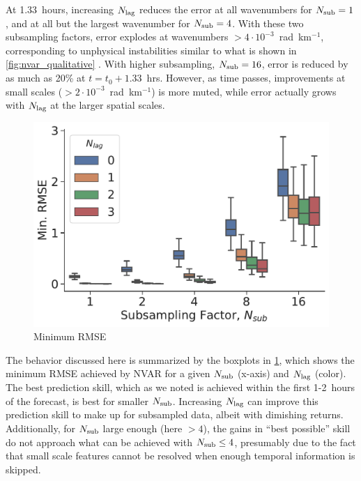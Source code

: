 At 1.33~hours, increasing $N_\text{lag}$ reduces the error at all wavenumbers for
$N_\text{sub}=1$, and at all but the largest wavenumber for $N_\text{sub}=4$.
With these two subsampling factors, error explodes at wavenumbers
$>4\cdot10^{-3}$~rad~km$^{-1}$,
corresponding to unphysical instabilities similar to what is
shown in \cref{fig:nvar_qualitative} .
With higher subsampling, $N_\text{sub}=16$, error is reduced by as much as 20\% at
$t=t_0 + 1.33$~hrs.
However, as time passes, improvements at small scales
($>2\cdot10^{-3}$~rad~km$^{-1}$) is more muted, while error actually grows
with $N_\text{lag}$ at the larger spatial scales.

\begin{figure}
    \centering
    \includegraphics[width=.5\textwidth]{../figures/nvar-mrmse-vs-lag-050samples.pdf}
    \caption{Minimum RMSE}
    \label{fig:nvar_min_rmse}
\end{figure}

The behavior discussed here is summarized by the boxplots in
\cref{fig:nvar_min_rmse}, which shows the minimum RMSE achieved by NVAR for a
given $N_\text{sub}$ (x-axis) and $N_\text{lag}$ (color).
The best prediction skill, which as we noted is achieved within the first
1-2~hours of the forecast, is best for smaller $N_\text{sub}$.
Increasing $N_\text{lag}$ can improve this prediction skill to make up for subsampled
data, albeit with dimishing returns.
Additionally, for $N_\text{sub}$ large enough
(here $>4$), the gains in ``best possible'' skill do not approach what can be
achieved with $N_\text{sub}\le 4$, presumably due to the fact that small scale features
cannot be resolved when enough temporal information is skipped.
